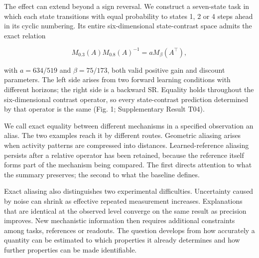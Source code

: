 \documentclass[11pt,a4paper]{article}
\begin{document}
\par
\noindent\begin{minipage}{\linewidth}

The effect can extend beyond a sign reversal. We construct a seven-state
task in which each state transitions with equal probability to states 1,
2 or 4 steps ahead in its cyclic numbering. Its entire six-dimensional
state-contrast space admits the exact relation

\[
M_{0.3}(A)M_{0.8}(A)^{-1}
=aM_\beta(A^\top),
\]

\end{minipage}\par

with \(a=634/519\) and \(\beta=75/173\), both valid positive gain and
discount parameters. The left side arises from two forward learning
conditions with different horizons; the right side is a backward SR.
Equality holds throughout the six-dimensional contrast operator, so
every state-contrast prediction determined by that operator is the same
(Fig. 1; Supplementary Result T04).

We call exact equality between different mechanisms in a specified
observation an alias. The two examples reach it by different routes.
Geometric aliasing arises when activity patterns are compressed into
distances. Learned-reference aliasing persists after a relative operator
has been retained, because the reference itself forms part of the
mechanism being compared. The first directs attention to what the
summary preserves; the second to what the baseline defines.

Exact aliasing also distinguishes two experimental difficulties.
Uncertainty caused by noise can shrink as effective repeated measurement
increases. Explanations that are identical at the observed level
converge on the same result as precision improves. New mechanistic
information then requires additional constraints among tasks, references
or readouts. The question develops from how accurately a quantity can be
estimated to which properties it already determines and how further
properties can be made identifiable.
\end{document}
